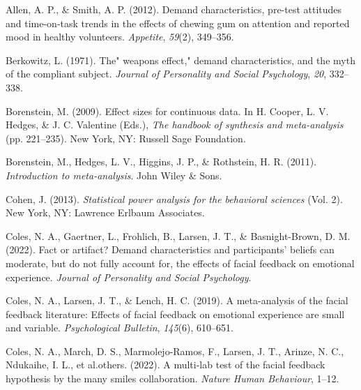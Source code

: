 \documentclass[
  man,floatsintext]{apa6}
\newlength{\cslhangindent}
\newlength{\cslentryspacingunit} %
\newenvironment{CSLReferences}[2] %
 {%
  \setlength{\parindent}{0pt}
  \ifodd #1
  \let\oldpar\par
  \def\par{\hangindent=\cslhangindent\oldpar}
  \fi
  \setlength{\parskip}{#2\cslentryspacingunit}
 }%
 {}
\begin{document}
\hypertarget{refs}{}
\begin{CSLReferences}{1}{0}
\leavevmode{}%
Allen, A. P., \& Smith, A. P. (2012). Demand characteristics, pre-test attitudes and time-on-task trends in the effects of chewing gum on attention and reported mood in healthy volunteers. \emph{Appetite}, \emph{59}(2), 349--356.

\leavevmode{}%
Berkowitz, L. (1971). The" weapons effect," demand characteristics, and the myth of the compliant subject. \emph{Journal of Personality and Social Psychology}, \emph{20}, 332--338.

\leavevmode{}%
Borenstein, M. (2009). Effect sizes for continuous data. In H. Cooper, L. V. Hedges, \& J. C. Valentine (Eds.), \emph{The handbook of synthesis and meta-analysis} (pp. 221--235). New York, NY: Russell Sage Foundation.

\leavevmode{}%
Borenstein, M., Hedges, L. V., Higgins, J. P., \& Rothstein, H. R. (2011). \emph{Introduction to meta-analysis}. John Wiley \& Sons.

\leavevmode{}%
Cohen, J. (2013). \emph{Statistical power analysis for the behavioral sciences} (Vol. 2). New York, NY: Lawrence Erlbaum Associates.

\leavevmode{}%
Coles, N. A., Gaertner, L., Frohlich, B., Larsen, J. T., \& Basnight-Brown, D. M. (2022). Fact or artifact? Demand characteristics and participants' beliefs can moderate, but do not fully account for, the effects of facial feedback on emotional experience. \emph{Journal of Personality and Social Psychology}.

\leavevmode{}%
Coles, N. A., Larsen, J. T., \& Lench, H. C. (2019). A meta-analysis of the facial feedback literature: Effects of facial feedback on emotional experience are small and variable. \emph{Psychological Bulletin}, \emph{145}(6), 610--651.

\leavevmode{}%
Coles, N. A., March, D. S., Marmolejo-Ramos, F., Larsen, J. T., Arinze, N. C., Ndukaihe, I. L., et al.others. (2022). A multi-lab test of the facial feedback hypothesis by the many smiles collaboration. \emph{Nature Human Behaviour}, 1--12.


\end{CSLReferences}
\end{document}

